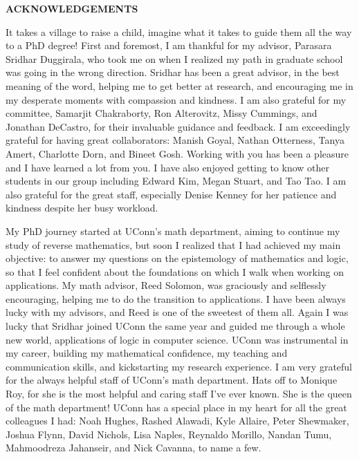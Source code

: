 
\begin{center}
\vspace*{52pt}
{\textbf{ACKNOWLEDGEMENTS}}
\end{center}

It takes a village to raise a child, imagine what it takes to guide them all the way to a PhD degree!
%
First and foremost, I am thankful for my advisor, Parasara Sridhar Duggirala, who took me on when I realized my path in graduate school was going in the wrong direction.
%
Sridhar has been a great advisor, in the best meaning of the word, helping me to get better at research, and encouraging me in my desperate moments with compassion and kindness.
%
I am also grateful for my committee, Samarjit Chakraborty, Ron Alterovitz, Missy Cummings, and Jonathan DeCastro, for their invaluable guidance and feedback.
%
I am exceedingly grateful for having great collaborators: Manish Goyal, Nathan Otterness, Tanya Amert, Charlotte Dorn, and Bineet Gosh.
%
Working with you has been a pleasure and I have learned a lot from you.
%
I have also enjoyed getting to know other students in our group including Edward Kim, Megan Stuart, and Tao Tao.
%
I am also grateful for the great staff, especially Denise Kenney for her patience and kindness despite her busy workload.


My PhD journey started at UConn's math department, aiming to continue my study of reverse mathematics, but soon I realized that I had achieved my main objective: to answer my questions on the epistemology of mathematics and logic, so that I feel confident about the foundations on which I walk when working on applications.
%
My math advisor, Reed Solomon, was graciously and selflessly encouraging, helping me to do the transition to applications.
%
I have been always lucky with my advisors, and Reed is one of the sweetest of them all.
%
Again I was lucky that Sridhar joined UConn the same year and guided me through a whole new world, applications of logic in computer science.
%
UConn was instrumental in my career, building my mathematical confidence, my teaching and communication skills, and kickstarting my research experience.
%
I am very grateful for the always helpful staff of UConn's math department.
%
Hats off to Monique Roy, for she is the most helpful and caring staff I've ever known.
%
She is the queen of the math department!
%
UConn has a special place in my heart for all the great colleagues I had: Noah Hughes, Rashed Alawadi, Kyle Allaire, Peter Shewmaker, Joshua Flynn, David Nichols, Lisa Naples, Reynaldo Morillo, Nandan Tumu, Mahmoodreza Jahanseir, and Nick Cavanna, to name a few.
%


\clearpage
